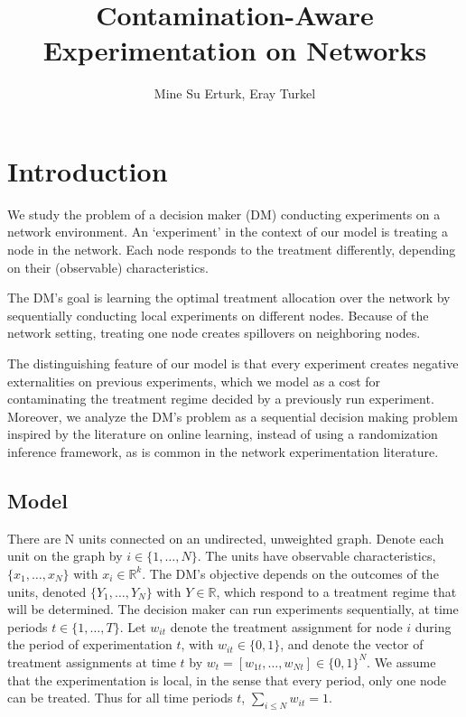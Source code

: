 \documentclass[11pt,a4paper]{article}
\author{Mine Su Erturk, Eray Turkel}
\title{ Contamination-Aware Experimentation on Networks }
\begin{document}
\maketitle

\section{Introduction}
We study the problem of a decision maker (DM) conducting experiments on a network environment. An `experiment' in the context of our model is treating a node in the network. Each node responds to the treatment differently, depending on their (observable) characteristics.

The DM's goal is learning the optimal treatment allocation over the network by sequentially conducting local experiments on different nodes. Because of the network setting, treating one node creates spillovers on neighboring nodes.

The distinguishing feature of our model is that every experiment creates negative externalities on previous experiments, which we model as a cost for contaminating the treatment regime decided by a previously run experiment. Moreover, we analyze the DM's problem as a sequential decision making problem inspired by the literature on online learning, instead of using a randomization inference framework, as is common in the network experimentation literature.

\subsection{Model}

There are N units connected on an undirected, unweighted graph. Denote each unit on the graph by $i \in \{1, \dots, N \}$. The units have observable characteristics, $\{x_1 , \dots, x_N \}$ with $x_i \in \mathbb{R}^k$. The DM's objective depends on the outcomes of the units, denoted $\{Y_1 , \dots, Y_N\}$ with $Y \in \mathbb{R}$, which respond to a treatment regime that will be determined. The decision maker can run experiments sequentially, at time periods $t \in \{1, \dots , T\}$. Let $w_{it}$ denote the treatment assignment for node $i$ during the period of experimentation $t$, with $w_{it} \in \{0,1\}$, and denote the vector of treatment assignments at time $t$ by $w_t = [w_{1t}, \dots , w_{Nt}] \in \{0,1\}^N$. We assume that the experimentation is local, in the sense that every period, only one node can be treated. Thus for all time periods $t$, $\sum_{i \leq N} w_{it} = 1$.
\end{document}
